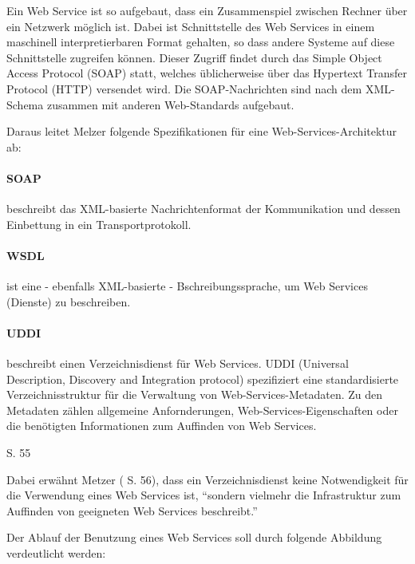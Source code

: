 Ein Web Service ist so aufgebaut, dass ein Zusammenspiel zwischen Rechner über ein Netzwerk möglich ist.
Dabei ist Schnittstelle des Web Services in einem maschinell interpretierbaren Format gehalten, so dass andere Systeme auf diese Schnittstelle zugreifen können.
Dieser Zugriff findet durch das Simple Object Access Protocol (\gls{SOAP}) statt, welches üblicherweise über das Hypertext Transfer Protocol (\gls{HTTP}) versendet wird.
Die \gls{SOAP}-Nachrichten sind nach dem \gls{XML}-Schema zusammen mit anderen Web-Standards aufgebaut.




Daraus leitet Melzer folgende Spezifikationen für eine Web-Services-Architektur ab:

\paragraph{SOAP}
beschreibt das \gls{XML}-basierte Nachrichtenformat der Kommunikation und dessen Einbettung in ein Transportprotokoll.
\paragraph{WSDL}
ist eine - ebenfalls \gls{XML}-basierte - Bschreibungssprache, um Web Services (Dienste) zu beschreiben.
\paragraph{UDDI}
beschreibt einen Verzeichnisdienst für Web Services. \gls{UDDI} (Universal Description, Discovery and Integration protocol) spezifiziert eine standardisierte Verzeichnisstruktur für die Verwaltung von Web-Services-Metadaten.
Zu den Metadaten zählen allgemeine Anfornderungen, Web-Services-Eigenschaften oder die benötigten Informationen zum Auffinden von Web Services.
\begin{flushright}\cite{Melzer08} S. 55\end{flushright}

Dabei erwähnt Metzer (\cite{Melzer08} S. 56), dass ein Verzeichnisdienst keine Notwendigkeit für die Verwendung eines Web Services ist, "`sondern vielmehr die Infrastruktur zum Auffinden von geeigneten Web Services beschreibt."'


Der Ablauf der Benutzung eines Web Services soll durch folgende Abbildung verdeutlicht werden:

